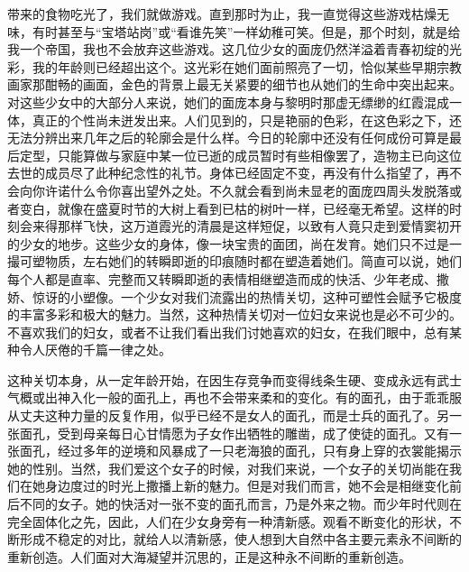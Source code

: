 \par 带来的食物吃光了，我们就做游戏。直到那时为止，我一直觉得这些游戏枯燥无味，有时甚至与“宝塔站岗”或“看谁先笑”一样幼稚可笑。但是，那个时刻，就是给我一个帝国，我也不会放弃这些游戏。这几位少女的面庞仍然洋溢着青春初绽的光彩，我的年龄则已经超出这个。这光彩在她们面前照亮了一切，恰似某些早期宗教画家那酣畅的画面，金色的背景上最无关紧要的细节也从她们的生命中突出起来。对这些少女中的大部分人来说，她们的面庞本身与黎明时那虚无缥缈的红霞混成一体，真正的个性尚未迸发出来。人们见到的，只是艳丽的色彩，在这色彩之下，还无法分辨出来几年之后的轮廓会是什么样。今日的轮廓中还没有任何成份可算是最后定型，只能算做与家庭中某一位已逝的成员暂时有些相像罢了，造物主已向这位去世的成员尽了此种纪念性的礼节。身体已经固定不变，再没有什么指望了，再不会向你许诺什么令你喜出望外之处。不久就会看到尚未显老的面庞四周头发脱落或者变白，就像在盛夏时节的大树上看到已枯的树叶一样，已经毫无希望。这样的时刻会来得那样飞快，这万道霞光的清晨是这样短促，以致有人竟只走到爱情窦初开的少女的地步。这些少女的身体，像一块宝贵的面团，尚在发育。她们只不过是一撮可塑物质，左右她们的转瞬即逝的印痕随时都在塑造着她们。简直可以说，她们每个人都是直率、完整而又转瞬即逝的表情相继塑造而成的快活、少年老成、撒娇、惊讶的小塑像。一个少女对我们流露出的热情关切，这种可塑性会赋予它极度的丰富多彩和极大的魅力。当然，这种热情关切对一位妇女来说也是必不可少的。不喜欢我们的妇女，或者不让我们看出我们讨她喜欢的妇女，在我们眼中，总有某种令人厌倦的千篇一律之处。
\par 这种关切本身，从一定年龄开始，在因生存竞争而变得线条生硬、变成永远有武士气概或出神入化一般的面孔上，再也不会带来柔和的变化。有的面孔，由于乖乖服从丈夫这种力量的反复作用，似乎已经不是女人的面孔，而是士兵的面孔了。另一张面孔，受到母亲每日心甘情愿为子女作出牺牲的雕凿，成了使徒的面孔。又有一张面孔，经过多年的逆境和风暴成了一只老海狼的面孔，只有身上穿的衣裳能揭示她的性别。当然，我们爱这个女子的时候，对我们来说，一个女子的关切尚能在我们在她身边度过的时光上撒播上新的魅力。但是对我们而言，她不会是相继变化前后不同的女子。她的快活对一张不变的面孔而言，乃是外来之物。而少年时代则在完全固体化之先，因此，人们在少女身旁有一种清新感。观看不断变化的形状，不断形成不稳定的对比，就给人以清新感，使人想到大自然中各主要元素永不间断的重新创造。人们面对大海凝望并沉思的，正是这种永不间断的重新创造。
